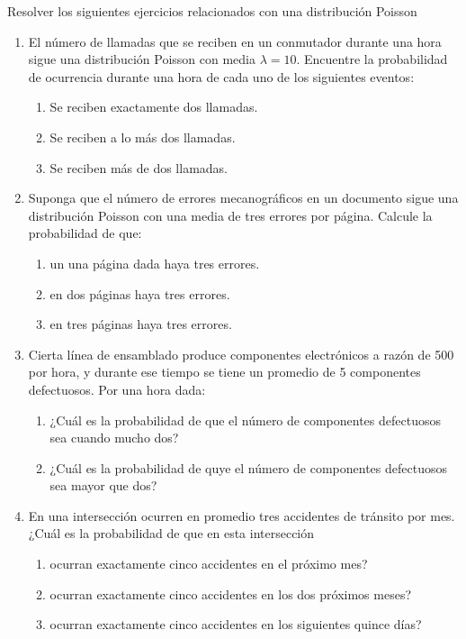 \begin{Ejer}
Resolver los siguientes ejercicios relacionados con una distribuci\'on Poisson

\begin{enumerate}
\item El número de llamadas que se reciben en un conmutador durante una hora sigue una distribución Poisson con media $\lambda=10$. Encuentre la probabilidad de ocurrencia durante una hora de cada uno de los siguientes eventos:
\begin{enumerate}
\item Se reciben exactamente dos llamadas.
\item Se reciben a lo más dos llamadas.
\item Se reciben más de dos llamadas.
\end{enumerate}

\item Suponga que el número de errores mecanográficos en un documento sigue una distribución Poisson con una media de tres errores por página. Calcule la probabilidad de que:
\begin{enumerate}
\item un una página dada haya tres errores.
\item en dos páginas haya tres errores.
\item en tres páginas haya tres errores.
\end{enumerate}

\item Cierta línea de ensamblado produce componentes electrónicos a razón de 500 por hora, y durante ese tiempo se tiene un promedio de 5 componentes defectuosos. Por una hora dada:
\begin{enumerate}
\item ¿Cuál es la probabilidad de que el número de componentes defectuosos sea cuando mucho dos?
\item ¿Cuál es la probabilidad de quye el número de componentes defectuosos sea mayor que dos?
\end{enumerate}

\item En una intersección ocurren en promedio tres accidentes de tránsito por mes. ¿Cuál es la probabilidad de que en esta intersección
\begin{enumerate}
\item ocurran exactamente cinco accidentes en el próximo mes?
\item ocurran exactamente cinco accidentes en los dos próximos meses?
\item ocurran exactamente cinco accidentes en los siguientes quince días?
\end{enumerate}

\end{enumerate}
\end{Ejer}


